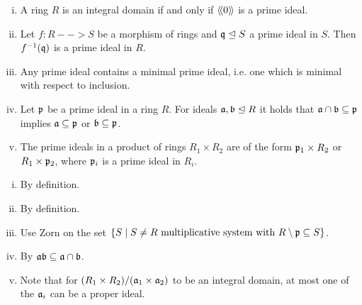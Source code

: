 	\begin{lemma}\vspace{-1.5em}
		\begin{enumerate}[(i)]
			\item{
				A ring $R$ is an integral domain if and only if $\langle\!\langle 0 \rangle\!\rangle$ is a prime ideal.
			}
			\item{
				Let $f:R-->S$ be a morphism of rings and $\mathfrak{q} \trianglelefteq S$ a prime ideal in $S$. Then $f^{-1}(\mathfrak{q})$ is a prime ideal in $R$.
			}
			\item{
				Any prime ideal contains a minimal prime ideal, i.e. one which is minimal with respect to inclusion.
			}
			\item{
				Let $\mathfrak{p}$ be a prime ideal in a ring $R$. For ideals $\mathfrak{a},\mathfrak{b} \trianglelefteq R$ it holds that $\mathfrak{a} \cap \mathfrak{b} \subseteq \mathfrak{p}$ implies $\mathfrak{a} \subseteq \mathfrak{p}$ or $\mathfrak{b} \subseteq \mathfrak{p}$.
			}
			\item{
				The prime ideals in a product of rings $R_1 \times R_2$ are of the form $\mathfrak{p}_1 \times R_2$ or $R_1 \times \mathfrak{p}_2$, where $\mathfrak{p}_i$ is a prime ideal in $R_i$.

			}
		\end{enumerate}
	\end{lemma}
	\begin{sketch}
		\begin{enumerate}[(i)]
			\item{
				By definition.
			}
			\item{
				By definition.
			}
			\item{
				Use Zorn on the set $\{S \mid S \neq R \text{ multiplicative system with }R \setminus \mathfrak{p} \subseteq S\}$.
			}
			\item{
				By $\mathfrak{ab} \subseteq \mathfrak{a} \cap \mathfrak{b}$.
			}
			\item{
				Note that for $(R_1 \times R_2) / (\mathfrak{a}_1 \times \mathfrak{a}_2)$ to be an integral domain, at most one of the $\mathfrak{a}_i$ can be a proper ideal.
			}
			\vspace{-1.8em}
		\end{enumerate}
	\end{sketch}

